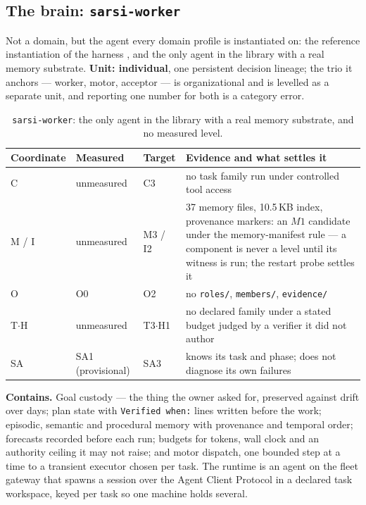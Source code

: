 \subsection{The brain: \texttt{sarsi-worker}}\label{sec:worker}

Not a domain, but the agent every domain profile is instantiated on: the reference instantiation of the harness \citep{yang2026harness}, and the only agent in the library with a real memory substrate. \textbf{Unit: individual}, one persistent decision lineage; the trio it anchors --- worker, motor, acceptor --- is organizational and is levelled as a separate unit, and reporting one number for both is a category error.

\begin{table}[!htbp]
\centering\small
\begin{tabularx}{\textwidth}{@{}lllY@{}}
\toprule
Coordinate & Measured & Target & Evidence and what settles it \\
\midrule
C & unmeasured & C3 & no task family run under controlled tool access \\
M / I & unmeasured & M3 / I2 & 37 memory files, 10.5\,KB index, provenance markers: an $M1$ candidate under the memory-manifest rule --- a component is never a level until its witness is run; the restart probe settles it \\
O & O0 & O2 & no \texttt{roles/}, \texttt{members/}, \texttt{evidence/} \\
T$\cdot$H & unmeasured & T3$\cdot$H1 & no declared family under a stated budget judged by a verifier it did not author \\
SA & SA1 (provisional) & SA3 & knows its task and phase; does not diagnose its own failures \\
\bottomrule
\end{tabularx}
\caption{\texttt{sarsi-worker}: the only agent in the library with a real memory substrate, and no measured level.}
\label{tab:worker}
\end{table}

\textbf{Contains.} Goal custody --- the thing the owner asked for, preserved against drift over days; plan state with \texttt{Verified when:} lines written before the work; episodic, semantic and procedural memory with provenance and temporal order; forecasts recorded before each run; budgets for tokens, wall clock and an authority ceiling it may not raise; and motor dispatch, one bounded step at a time to a transient executor chosen per task. The runtime is an agent on the fleet gateway that spawns a session over the Agent Client Protocol in a declared task workspace, keyed per task so one machine holds several.

